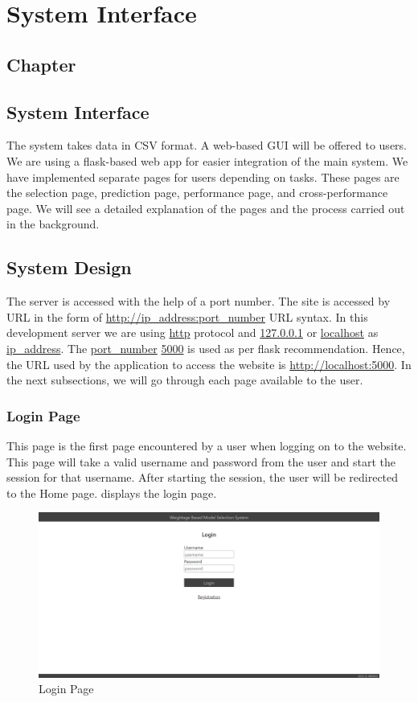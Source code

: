 \thispagestyle{fancy}
\chapter{System Interface} \label{ch:system_interface}
\section*{\centering Chapter \thechapter}
\section*{\centering System Interface}

The system takes data in CSV format. A web-based GUI will be offered to users. We are using a flask-based web app for easier integration of the main system. We have implemented separate pages for users depending on tasks. These pages are the selection page, prediction page, performance page, and cross-performance page. We will see a detailed explanation of the pages and the process carried out in the background.

\section{System Design} \label{sec:system_design}

The server is accessed with the help of a port number. The site is accessed by URL in the form of \url{http://ip_address:port_number} URL syntax. In this development server we are using \url{http} protocol and \url{127.0.0.1} or \url{localhost} as \url{ip_address}. The \url{port_number} \url{5000} is used as per flask recommendation. Hence, the URL used by the application to access the website is \url{http://localhost:5000}. In the next subsections, we will go through each page available to the user.

\subsection{Login Page} \label{subsec:login_page}
This page is the first page encountered by a user when logging on to the website. This page will take a valid username and password from the user and start the session for that username. After starting the session, the user will be redirected to the Home page.  displays the login page.

\begin{figure}[H]
  \centering
  \includegraphics[width=0.7\columnwidth]{media/website/pages/login.png}
  \caption{Login Page}
  \label{fig:web_login_page}
\end{figure}

